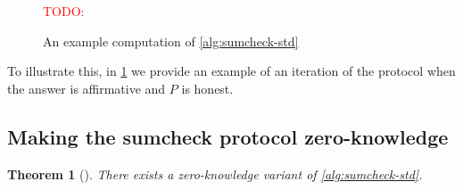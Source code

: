 \documentclass[english,12pt]{reedthesis}
\theoremstyle{plain}
\newtheorem{thm}{Theorem}[section]
\theoremstyle{definition}
\theoremstyle{remark}
\newcommand{\TODO}[1]{\textcolor{red}{TODO: #1}}
\begin{document}
\begin{figure}[htbp]
  \TODO{}
  \caption{An example computation of \cref{alg:sumcheck-std}}\label{fig:sumcheck-ex}
\end{figure}

To illustrate this, in \cref{fig:sumcheck-ex} we provide an example of an
iteration of the protocol when the answer is affirmative and $P$ is honest.

\subsection{Making the sumcheck protocol zero-knowledge}

\begin{thm}[{\cite[Theorem 13.3]{CFGS22}}]\label{thm:zk-sumcheck}
  There exists a zero-knowledge variant of \cref{alg:sumcheck-std}.
\end{thm}
\end{document}
